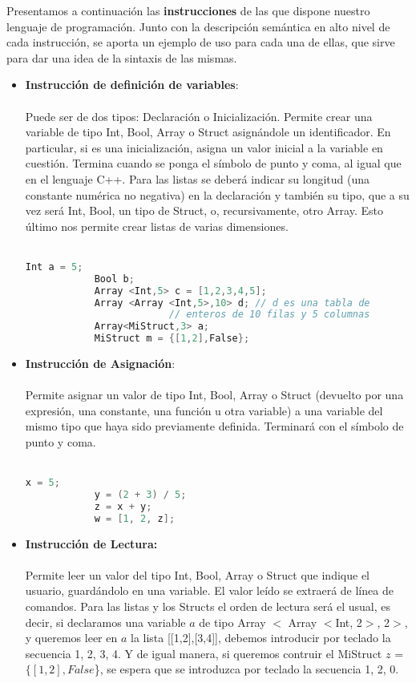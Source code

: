 \documentclass[12pt,onecolumn]{article}
\begin{document}
	\newpage
	
	Presentamos a continuación las \textbf{instrucciones} de las que dispone nuestro lenguaje de programación. Junto con la descripción semántica en alto nivel de cada instrucción, se aporta un ejemplo de uso para cada una de ellas, que sirve para dar una idea de la sintaxis de las mismas. \\
	
	\begin{itemize}
		\item \textbf{Instrucción de definición de variables}: \\ \\
		Puede ser de dos tipos: Declaración o Inicialización. Permite crear una variable de tipo Int, Bool, Array o Struct asignándole un identificador. En particular, si es una inicialización, asigna un valor inicial a la variable en cuestión. Termina cuando se ponga el símbolo de punto y coma, al igual que en el lenguaje C++. Para las listas se deberá indicar su longitud (una constante numérica no negativa) en la declaración y también su tipo, que a su vez será Int, Bool, un tipo de Struct, o, recursivamente, otro Array. Esto último nos permite crear listas de varias dimensiones. \\ \\
		\begin{lstlisting}[language=C++,gobble=15]
			Int a = 5;
			Bool b;
			Array <Int,5> c = [1,2,3,4,5];
			Array <Array <Int,5>,10> d; // d es una tabla de
			             // enteros de 10 filas y 5 columnas
			Array<MiStruct,3> a;
			MiStruct m = {[1,2],False};
		\end{lstlisting}
		\bigskip
		\item \textbf{Instrucción de Asignación}: \\ \\
		Permite asignar un valor de tipo Int, Bool, Array o Struct (devuelto por una expresión, una constante, una función u otra variable) a una variable del mismo tipo que haya sido previamente definida. Terminará con el símbolo de punto y coma.\\ \\
		\begin{lstlisting}[language=C++]
			x = 5;
			y = (2 + 3) / 5;
			z = x + y;
			w = [1, 2, z];
		\end{lstlisting}
		\newpage
		\item \textbf{Instrucción de Lectura:} \\ \\
		Permite leer un valor del tipo Int, Bool, Array o Struct que indique el usuario, guardándolo en una variable. El valor leído se extraerá de línea de comandos. Para las listas y los Structs el orden de lectura será el usual, es decir, si declaramos una variable $a$ de tipo Array $<$ Array $<$Int, 2$>$, 2$>$, y queremos leer en $a$ la lista [[1,2],[3,4]], debemos introducir por teclado la secuencia 1, 2, 3, 4. Y de igual manera, si queremos contruir el MiStruct $z$ = $\{[1,2],False$\}, se espera que se introduzca por teclado la secuencia 1, 2, 0. \\ \\

\end{itemize}
\end{document}
